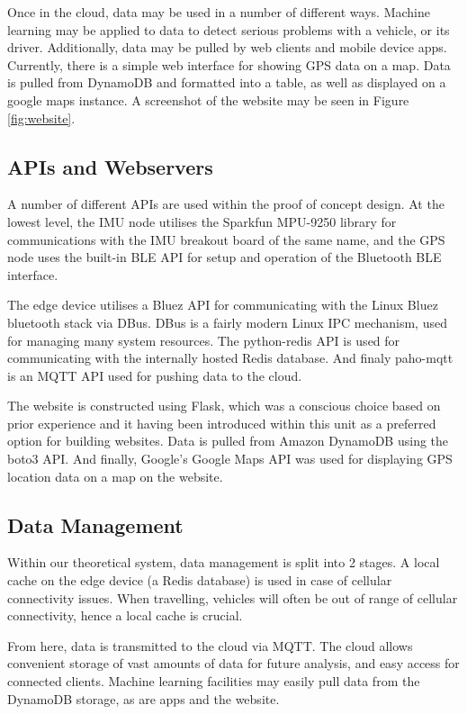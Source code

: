 \documentclass[DIV=current]{scrartcl}
\begin{document}
	Once in the cloud, data may be used in a number of different ways. Machine learning may be applied to data to detect serious problems with a vehicle, or its driver. Additionally, data may be pulled by web clients and mobile device apps. Currently, there is a simple web interface for showing GPS data on a map. Data is pulled from DynamoDB and formatted into a table, as well as displayed on a google maps instance. A screenshot of the website may be seen in Figure \ref{fig:website}.
	
	\subsection{APIs and Webservers}
	A number of different APIs are used within the proof of concept design. At the lowest level, the IMU node utilises the Sparkfun MPU-9250 library for communications with the IMU breakout board of the same name, and the GPS node uses the built-in BLE API for setup and operation of the Bluetooth BLE interface.
	
	The edge device utilises a Bluez API for communicating with the Linux Bluez bluetooth stack via DBus. DBus is a fairly modern Linux IPC mechanism, used for managing many system resources. The python-redis API is used for communicating with the internally hosted Redis database. And finaly paho-mqtt is an MQTT API used for pushing data to the cloud.
	
	The website is constructed using Flask, which was a conscious choice based on prior experience and it having been introduced within this unit as a preferred option for building websites. Data is pulled from Amazon DynamoDB using the boto3 API. And finally, Google's Google Maps API was used for displaying GPS location data on a map on the website.
	
	\subsection{Data Management}
	Within our theoretical system, data management is split into 2 stages. A local cache on the edge device (a Redis database) is used in case of cellular connectivity issues. When travelling, vehicles will often be out of range of cellular connectivity, hence a local cache is crucial.
	
	From here, data is transmitted to the cloud via MQTT. The cloud allows convenient storage of vast amounts of data for future analysis, and easy access for connected clients. Machine learning facilities may easily pull data from the DynamoDB storage, as are apps and the website.
	
\end{document}
